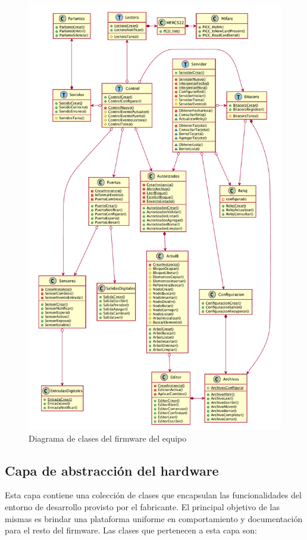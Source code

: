 \begin{figure}[ht]
	\centering
	\includegraphics[width=\textwidth]{./Figures/PNK-DC002.pdf}
	\caption{Diagrama de clases del firmware del equipo}
	\label{fig:DiagramaClases}
\end{figure}

\subsection{Capa de abstracción del hardware}

Esta capa contiene una colección de clases que encapsulan las funcionalidades del entorno de desarrollo provisto por el fabricante. El principal objetivo de las mismas es brindar una plataforma uniforme en comportamiento y documentación para el resto del firmware. Las clases que pertenecen a esta capa son:

